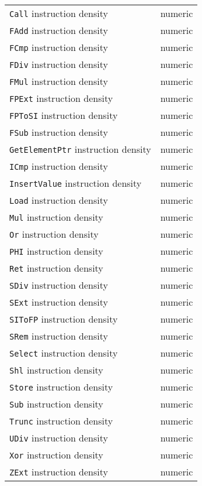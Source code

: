 \begin{table}
\begin{multicols}{2}
\begin{tabular}{p{4.5cm}p{1.3cm}}
      \texttt{Call} instruction density & numeric \\
      \texttt{FAdd} instruction density & numeric \\
      \texttt{FCmp} instruction density & numeric \\
      \texttt{FDiv} instruction density & numeric \\
      \texttt{FMul} instruction density & numeric \\
      \texttt{FPExt} instruction density & numeric \\
      \texttt{FPToSI} instruction density & numeric \\
      \texttt{FSub} instruction density & numeric \\
      \texttt{GetElementPtr} instruction density & numeric \\
      \texttt{ICmp} instruction density & numeric \\
      \texttt{InsertValue} instruction density & numeric \\
      \texttt{Load} instruction density & numeric \\
      \texttt{Mul} instruction density & numeric \\
      \texttt{Or} instruction density & numeric \\
      \texttt{PHI} instruction density & numeric \\
      \texttt{Ret} instruction density & numeric \\
      \texttt{SDiv} instruction density & numeric \\
      \texttt{SExt} instruction density & numeric \\
      \texttt{SIToFP} instruction density & numeric \\
      \texttt{SRem} instruction density & numeric \\
      \texttt{Select} instruction density & numeric \\
      \texttt{Shl} instruction density & numeric \\
      \texttt{Store} instruction density & numeric \\
      \texttt{Sub} instruction density & numeric \\
      \texttt{Trunc} instruction density & numeric \\
      \texttt{UDiv} instruction density & numeric \\
      \texttt{Xor} instruction density & numeric \\
      \texttt{ZExt} instruction density & numeric \\

\end{tabular}
\end{multicols}
\end{table}
